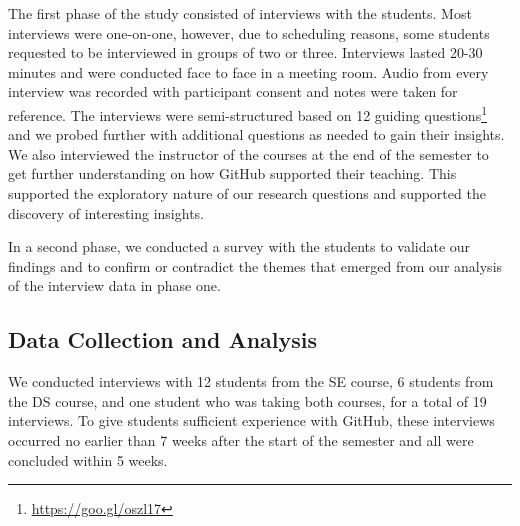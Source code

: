 The first phase of the study consisted of interviews with the students. Most interviews were one-on-one, however, due to scheduling reasons, some students requested to be interviewed in groups of two or three. Interviews lasted 20-30 minutes and were conducted face to face in a meeting room. Audio from every interview was recorded with participant consent and notes were taken for reference. The interviews were semi-structured based on 12 guiding questions\footnote{\url{https://goo.gl/oszl17}} and we probed further with additional questions as needed to gain their insights. We also interviewed the instructor of the courses at the end of the semester to get further understanding on how GitHub supported their teaching. This supported the exploratory nature of our research questions and supported the discovery of interesting insights.


In a second phase, we conducted a survey with the students to validate our findings and to confirm or contradict the themes that emerged from our analysis of the interview data in phase one.

\subsection{Data Collection and Analysis}
We conducted interviews with 12 students from the SE course, 6 students from the DS course, and one student who was taking both courses, for a total of 19 interviews.
To give students sufficient experience with GitHub, these interviews occurred no earlier than 7 weeks after the start of the semester and all were concluded within 5 weeks.

